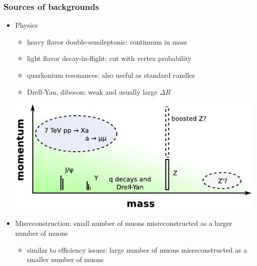 \documentclass[compress]{beamer}
\begin{document}
\begin{frame}
\begin{tabular}{c c}
\end{tabular}
\end{frame}

\begin{frame}
\frametitle{Sources of backgrounds}

\begin{itemize}
\item Physics
\begin{itemize}
\item heavy flavor double-semileptonic: continuum in mass
\item light flavor decay-in-flight: cut with vertex probability
\item quarkonium resonances: also useful as standard candles
\item Drell-Yan, diboson: weak and usually large $\Delta R$
\end{itemize}
\begin{center}
\includegraphics[width=0.7\linewidth]{where_we_live.pdf}
\end{center}

\item Misreconstruction: small number of muons misreconstructed as a
  larger number of muons
\begin{itemize}
\item similar to efficiency issues: large number of muons misreconstructed as
  a smaller number of muons
\end{itemize}
\end{itemize}
\end{frame}
\end{document}
